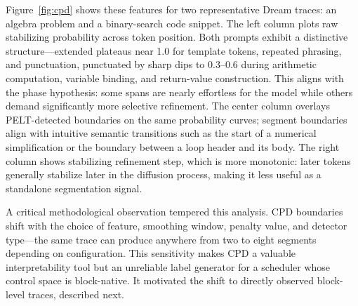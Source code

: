 \documentclass[11pt]{article}
\begin{document}
Figure~\ref{fig:cpd} shows these features for two representative Dream traces: an algebra problem and a binary-search code snippet. The left column plots raw stabilizing probability across token position. Both prompts exhibit a distinctive structure---extended plateaus near 1.0 for template tokens, repeated phrasing, and punctuation, punctuated by sharp dips to \(0.3\)--\(0.6\) during arithmetic computation, variable binding, and return-value construction. This aligns with the phase hypothesis: some spans are nearly effortless for the model while others demand significantly more selective refinement. The center column overlays PELT-detected boundaries on the same probability curves; segment boundaries align with intuitive semantic transitions such as the start of a numerical simplification or the boundary between a loop header and its body. The right column shows stabilizing refinement step, which is more monotonic: later tokens generally stabilize later in the diffusion process, making it less useful as a standalone segmentation signal.

A critical methodological observation tempered this analysis. CPD boundaries shift with the choice of feature, smoothing window, penalty value, and detector type---the same trace can produce anywhere from two to eight segments depending on configuration. This sensitivity makes CPD a valuable interpretability tool but an unreliable label generator for a scheduler whose control space is block-native. It motivated the shift to directly observed block-level traces, described next.
\end{document}
